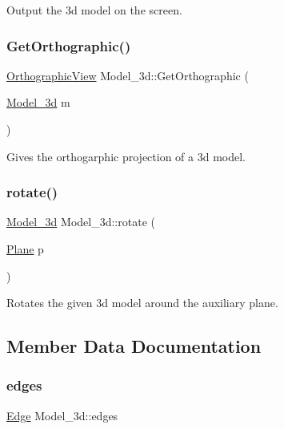 Output the 3d model on the screen. \mbox{\label{class_model__3d_ac19b2e10ea54b9e9772d5a4062cc2b9a}} 
\subsubsection{\texorpdfstring{Get\+Orthographic()}{GetOrthographic()}}
{\footnotesize\ttfamily \hyperlink{class_orthographic_view}{Orthographic\+View} Model\+\_\+3d\+::\+Get\+Orthographic (\begin{DoxyParamCaption}\item[{\hyperlink{class_model__3d}{Model\+\_\+3d}}]{m }\end{DoxyParamCaption})}

Gives the orthogarphic projection of a 3d model. \mbox{\label{class_model__3d_a94058b3f100e52c53b44a5b76308115e}} 
\subsubsection{\texorpdfstring{rotate()}{rotate()}}
{\footnotesize\ttfamily \hyperlink{class_model__3d}{Model\+\_\+3d} Model\+\_\+3d\+::rotate (\begin{DoxyParamCaption}\item[{\hyperlink{class_plane}{Plane}}]{p }\end{DoxyParamCaption})}

Rotates the given 3d model around the auxiliary plane. 

\subsection{Member Data Documentation}
\mbox{\label{class_model__3d_ab171a592efc8e90124f65404b46051cc}} 
\subsubsection{\texorpdfstring{edges}{edges}}
{\footnotesize\ttfamily \hyperlink{class_edge}{Edge} Model\+\_\+3d\+::edges}

